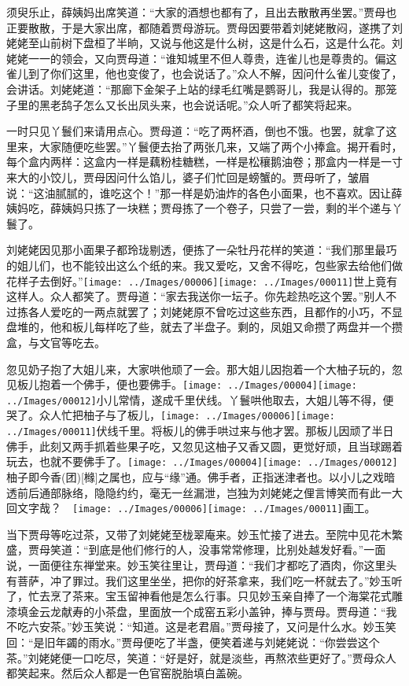 须臾乐止，薛姨妈出席笑道：``大家的酒想也都有了，且出去散散再坐罢。''贾母也正要散散，于是大家出席，都随着贾母游玩。贾母因要带着刘姥姥散闷，遂携了刘姥姥至山前树下盘桓了半晌，又说与他这是什么树，这是什么石，这是什么花。刘姥姥一一的领会，又向贾母道：``谁知城里不但人尊贵，连雀儿也是尊贵的。偏这雀儿到了你们这里，他也变俊了，也会说话了。''众人不解，因问什么雀儿变俊了，会讲话。刘姥姥道：``那廊下金架子上站的绿毛红嘴是鹦哥儿，我是认得的。那笼子里的黑老鸹子怎么又长出凤头来，也会说话呢。''众人听了都笑将起来。

一时只见丫鬟们来请用点心。贾母道：``吃了两杯酒，倒也不饿。也罢，就拿了这里来，大家随便吃些罢。''丫鬟便去抬了两张几来，又端了两个小捧盒。揭开看时，每个盒内两样：这盒内一样是藕粉桂糖糕，一样是松穰鹅油卷；那盒内一样是一寸来大的小饺儿，贾母因问什么馅儿，婆子们忙回是螃蟹的。贾母听了，皱眉说：``这油腻腻的，谁吃这个！''那一样是奶油炸的各色小面果，也不喜欢。因让薛姨妈吃，薛姨妈只拣了一块糕；贾母拣了一个卷子，只尝了一尝，剩的半个递与丫鬟了。

刘姥姥因见那小面果子都玲珑剔透，便拣了一朵牡丹花样的笑道：``我们那里最巧的姐儿们，也不能铰出这么个纸的来。我又爱吃，又舍不得吃，包些家去给他们做花样子去倒好。''{\texttt{[image: ../Images/00006]}\texttt{[image: ../Images/00011]}\footnotesize \kaishu 世上竟有这样人。}众人都笑了。贾母道：``家去我送你一坛子。你先趁热吃这个罢。''别人不过拣各人爱吃的一两点就罢了；刘姥姥原不曾吃过这些东西，且都作的小巧，不显盘堆的，他和板儿每样吃了些，就去了半盘子。剩的，凤姐又命攒了两盘并一个攒盒，与文官等吃去。

忽见奶子抱了大姐儿来，大家哄他顽了一会。那大姐儿因抱着一个大柚子玩的，忽见板儿抱着一个佛手，便也要佛手。{\texttt{[image: ../Images/00004]}\texttt{[image: ../Images/00012]}\footnotesize \kaishu 小儿常情，遂成千里伏线。}丫鬟哄他取去，大姐儿等不得，便哭了。众人忙把柚子与了板儿，{\texttt{[image: ../Images/00006]}\texttt{[image: ../Images/00011]}\footnotesize \kaishu 伏线千里。}将板儿的佛手哄过来与他才罢。那板儿因顽了半日佛手，此刻又两手抓着些果子吃，又忽见这柚子又香又圆，更觉好顽，且当球踢着玩去，也就不要佛手了。{\texttt{[image: ../Images/00004]}\texttt{[image: ../Images/00012]}\footnotesize \kaishu 柚子即今香{(团)}{[}橼{]}之属也，应与``缘''通。佛手者，正指迷津者也。以小儿之戏暗透前后通部脉络，隐隐约约，毫无一丝漏泄，岂独为刘姥姥之俚言博笑而有此一大回文字哉？　\texttt{[image: ../Images/00006]}\texttt{[image: ../Images/00011]}\footnotesize \kaishu 画工。}

当下贾母等吃过茶，又带了刘姥姥至栊翠庵来。妙玉忙接了进去。至院中见花木繁盛，贾母笑道：``到底是他们修行的人，没事常常修理，比别处越发好看。''一面说，一面便往东禅堂来。妙玉笑往里让，贾母道：``我们才都吃了酒肉，你这里头有菩萨，冲了罪过。我们这里坐坐，把你的好茶拿来，我们吃一杯就去了。''妙玉听了，忙去烹了茶来。宝玉留神看他是怎么行事。只见妙玉亲自捧了一个海棠花式雕漆填金云龙献寿的小茶盘，里面放一个成窑五彩小盖钟，捧与贾母。贾母道：``我不吃六安茶。''妙玉笑说：``知道。这是老君眉。''贾母接了，又问是什么水。妙玉笑回：``是旧年蠲的雨水。''贾母便吃了半盏，便笑着递与刘姥姥说：``你尝尝这个茶。''刘姥姥便一口吃尽，笑道：``好是好，就是淡些，再熬浓些更好了。''贾母众人都笑起来。然后众人都是一色官窑脱胎填白盖碗。

